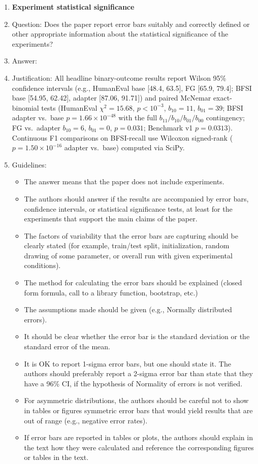 \begin{enumerate}
\item {\bf Experiment statistical significance}
    \item[] Question: Does the paper report error bars suitably and correctly defined or other appropriate information about the statistical significance of the experiments?
    \item[] Answer: \answerYes{}
    \item[] Justification: All headline binary-outcome results report Wilson 95\% confidence intervals (e.g., HumanEval base [48.4, 63.5], FG [65.9, 79.4]; BFSI base [54.95, 62.42], adapter [87.06, 91.71]) and paired McNemar exact-binomial tests (HumanEval $\chi^2{=}15.68$, $p<10^{-3}$, $b_{10}{=}11$, $b_{01}{=}39$; BFSI adapter vs.\ base $p{=}1.66\times10^{-48}$ with the full $b_{11}/b_{10}/b_{01}/b_{00}$ contingency; FG vs.\ adapter $b_{10}{=}6$, $b_{01}{=}0$, $p{=}0.031$; Benchmark v1 $p{=}0.0313$). Continuous F1 comparisons on BFSI-recall use Wilcoxon signed-rank ($p=1.50\times10^{-16}$ adapter vs.\ base) computed via SciPy.
    \item[] Guidelines:
    \begin{itemize}
        \item The answer \answerNA{} means that the paper does not include experiments.
        \item The authors should answer \answerYes{} if the results are accompanied by error bars, confidence intervals, or statistical significance tests, at least for the experiments that support the main claims of the paper.
        \item The factors of variability that the error bars are capturing should be clearly stated (for example, train/test split, initialization, random drawing of some parameter, or overall run with given experimental conditions).
        \item The method for calculating the error bars should be explained (closed form formula, call to a library function, bootstrap, etc.)
        \item The assumptions made should be given (e.g., Normally distributed errors).
        \item It should be clear whether the error bar is the standard deviation or the standard error of the mean.
        \item It is OK to report 1-sigma error bars, but one should state it. The authors should preferably report a 2-sigma error bar than state that they have a 96\% CI, if the hypothesis of Normality of errors is not verified.
        \item For asymmetric distributions, the authors should be careful not to show in tables or figures symmetric error bars that would yield results that are out of range (e.g., negative error rates).
        \item If error bars are reported in tables or plots, the authors should explain in the text how they were calculated and reference the corresponding figures or tables in the text.
    \end{itemize}


\end{enumerate}
